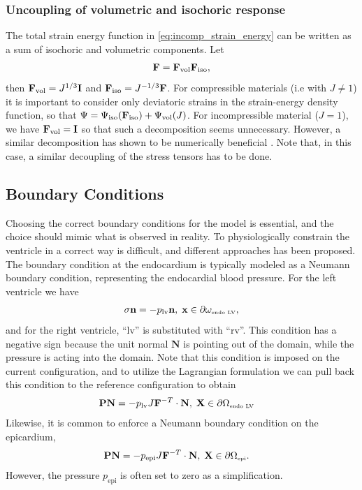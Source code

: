 \subsubsection{Uncoupling of volumetric and isochoric response}
The total strain energy function in \eqref{eq:incomp_strain_energy}
can be written as a sum of isochoric and volumetric components. Let
\begin{align}
  \mathbf{F} =  \mathbf{F}_{\mathrm{vol}} \mathbf{F}_{\mathrm{iso}},
\end{align}
then $ \mathbf{F}_{\mathrm{vol}} =
J^{1/3}\mathbf{I}$ and $\mathbf{F}_{\mathrm{iso}} = J^{-1/3}\mathbf{F}$. For
compressible materials (i.e with $J \neq 1$) it is important to consider
only deviatoric strains in the strain-energy density function, so that
$\Psi = \Psi_{\mathrm{iso}}(\mathbf{F}_{\mathrm{iso}}) +
\Psi_{\mathrm{vol}}(J)$. For incompressible material ($J = 1$), we
have $\mathbf{F}_{\mathrm{vol}} = \mathbf{I}$ so that such a decomposition seems
unnecessary. However, a similar decomposition has shown to be
numerically beneficial \cite{weiss1996finite}. Note that, in this case, a similar
decoupling of the stress tensors has to be done.

\subsection{Boundary Conditions}
\label{sec:mech_boudary}


Choosing the correct boundary conditions for the model is essential,
and the choice should mimic what is observed in reality. To
physiologically constrain the ventricle in a correct way is difficult,
and different approaches has been proposed.
The boundary condition at the endocardium is typically modeled as a
Neumann boundary condition, representing the endocardial blood
pressure. For the left ventricle we have
\begin{align}
  \sigma \mathbf{n} = -p_{\mathrm{lv}} \mathbf{n}, \;  \mathbf{x} \in  \partial \omega_{ \textnormal{\tiny \text{endo LV}}}, 
\end{align}
and for the right ventricle, ``lv'' is substituted with ``rv''.
This condition has a negative sign because the unit normal
$\mathbf{N}$ is pointing out of the domain, while the pressure is
acting into the domain. 
Note that this condition is imposed on the current configuration, and
to utilize the Lagrangian formulation we can pull back this condition
to the reference configuration to obtain
\begin{align}
  \mathbf{P}\mathbf{N} &= -p_{\mathrm{lv}} J\mathbf{F}^{-T} \cdot \mathbf{N}, \;  \mathbf{X} \in \partial \Omega_{ \textnormal{\tiny \text{endo LV}}}
\end{align}
Likewise, it is common to enforce a
Neumann boundary condition on the epicardium,
\begin{align}
\mathbf{P}\mathbf{N}  &= -p_{\mathrm{epi}}  J\mathbf{F}^{-T} \cdot \mathbf{N}, \;  \mathbf{X} \in \partial \Omega_{ \textnormal{\tiny \text{epi}}}.
\end{align}
However, the pressure $p_{\mathrm{epi}}$ is often set to zero as a
simplification. 

